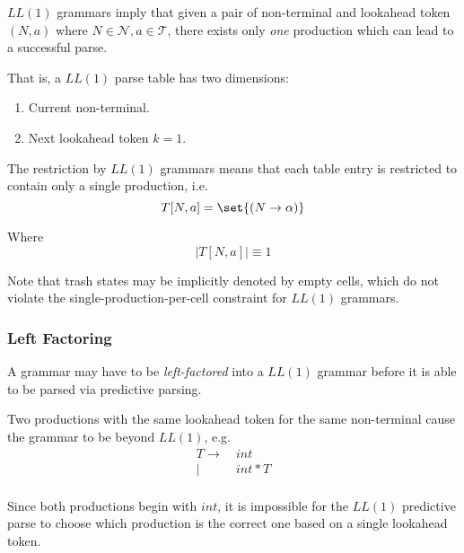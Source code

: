 \begin{definition}
    $LL(1)$ grammars imply that given a pair of non-terminal and lookahead token $(N, a)$ where $N \in \mathcal{N}, a \in \mathcal{T}$, there exists only \textit{one} production which can lead to a successful parse.
    
    That is, a $LL(1)$ parse table has two dimensions:
    \begin{enumerate}
        \item Current non-terminal.
        \item Next lookahead token $k = 1$.
    \end{enumerate}
    
    The restriction by $LL(1)$ grammars means that each table entry is restricted to contain only a single production, i.e.
    \begin{equation}
        T[N, a] = \set{ (N \to \alpha) }
    \end{equation}
    
    Where
    \begin{equation}
        \left\lvert T[N, a] \right\rvert \equiv 1
    \end{equation}
\end{definition}

\begin{remark}
    Note that trash states may be implicitly denoted by empty cells, which do not violate the single-production-per-cell constraint for $LL(1)$ grammars.
\end{remark}

\subsubsection{Left Factoring}

\begin{definition}
    A grammar may have to be \textit{left-factored} into a $LL(1)$ grammar before it is able to be parsed via predictive parsing.
\end{definition}

\begin{example}
    Two productions with the same lookahead token for the same non-terminal cause the grammar to be beyond $LL(1)$, e.g.
    \begin{equation}
        \begin{aligned}
            T \to  &\ int \\
              \mid &\ int * T \\
        \end{aligned}
    \end{equation}
    
    Since both productions begin with $int$, it is impossible for the $LL(1)$ predictive parse to choose which production is the correct one based on a single lookahead token.
\end{example}

